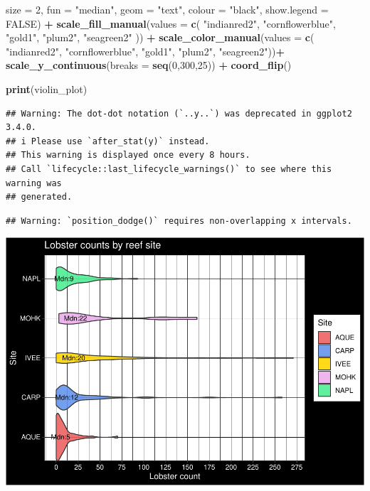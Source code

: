 \documentclass[
]{article}
\newenvironment{Shaded}{\begin{snugshade}}{\end{snugshade}}
\newcommand{\AttributeTok}[1]{\textcolor[rgb]{0.13,0.29,0.53}{#1}}
\newcommand{\ConstantTok}[1]{\textcolor[rgb]{0.56,0.35,0.01}{#1}}
\newcommand{\DecValTok}[1]{\textcolor[rgb]{0.00,0.00,0.81}{#1}}
\newcommand{\FunctionTok}[1]{\textcolor[rgb]{0.13,0.29,0.53}{\textbf{#1}}}
\newcommand{\NormalTok}[1]{#1}
\newcommand{\SpecialCharTok}[1]{\textcolor[rgb]{0.81,0.36,0.00}{\textbf{#1}}}
\newcommand{\StringTok}[1]{\textcolor[rgb]{0.31,0.60,0.02}{#1}}
\begin{document}
\begin{Shaded}
\begin{Highlighting}[]
    \AttributeTok{size =} \DecValTok{2}\NormalTok{,}
    \AttributeTok{fun =} \StringTok{"median"}\NormalTok{,}
    \AttributeTok{geom =} \StringTok{"text"}\NormalTok{,}
    \AttributeTok{colour =} \StringTok{"black"}\NormalTok{,}
    \AttributeTok{show.legend =} \ConstantTok{FALSE}\NormalTok{) }\SpecialCharTok{+}
  \FunctionTok{scale\_fill\_manual}\NormalTok{(}\AttributeTok{values =} \FunctionTok{c}\NormalTok{(}
    \StringTok{"indianred2"}\NormalTok{, }\StringTok{"cornflowerblue"}\NormalTok{, }\StringTok{"gold1"}\NormalTok{, }\StringTok{"plum2"}\NormalTok{, }\StringTok{"seagreen2"}
\NormalTok{  )) }\SpecialCharTok{+}
  \FunctionTok{scale\_color\_manual}\NormalTok{(}\AttributeTok{values =} \FunctionTok{c}\NormalTok{(}
    \StringTok{"indianred2"}\NormalTok{, }\StringTok{"cornflowerblue"}\NormalTok{, }\StringTok{"gold1"}\NormalTok{, }\StringTok{"plum2"}\NormalTok{, }\StringTok{"seagreen2"}\NormalTok{))}\SpecialCharTok{+}
  \FunctionTok{scale\_y\_continuous}\NormalTok{(}\AttributeTok{breaks =} \FunctionTok{seq}\NormalTok{(}\DecValTok{0}\NormalTok{,}\DecValTok{300}\NormalTok{,}\DecValTok{25}\NormalTok{)) }\SpecialCharTok{+}
  \FunctionTok{coord\_flip}\NormalTok{() }
  

\FunctionTok{print}\NormalTok{(violin\_plot)}
\end{Highlighting}
\end{Shaded}

\begin{verbatim}
## Warning: The dot-dot notation (`..y..`) was deprecated in ggplot2 3.4.0.
## i Please use `after_stat(y)` instead.
## This warning is displayed once every 8 hours.
## Call `lifecycle::last_lifecycle_warnings()` to see where this warning was
## generated.
\end{verbatim}

\begin{verbatim}
## Warning: `position_dodge()` requires non-overlapping x intervals.
\end{verbatim}

\includegraphics{hw1-lobstrs-eds241_files/figure-latex/unnamed-chunk-10-1.pdf}
\end{document}
